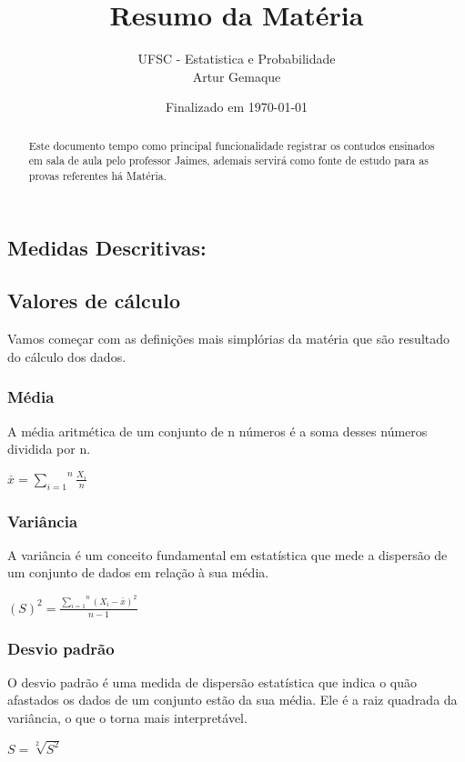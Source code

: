 \documentclass{article}
\title{\textbf{Resumo da Matéria}}
\author{UFSC - Estatistica e Probabilidade \\ Artur Gemaque}
\date{Finalizado em \today}
\begin{document}
\maketitle

\begin{abstract}
Este documento tempo como principal funcionalidade registrar os contudos ensinados em sala de aula pelo professor Jaimes, ademais servirá como fonte de estudo para as provas referentes há Matéria.
\end{abstract}

\begin{multicols}{2} %
\section{ Medidas Descritivas:}

  \subsection{Valores de cálculo}
      Vamos começar com as definições mais simplórias da matéria que são resultado do cálculo dos dados.

      \subsubsection{Média}
      A média aritmética de um conjunto de n números é a soma desses números dividida por n.
        \begin{center}
          $ \overset{\_}{x} =  \overset{n}{\underset{i=1}{\sum}} \frac{X_i}{n}  $
        \end{center}

      \subsubsection{Variância}
      A variância é um conceito fundamental em estatística que mede a dispersão de um conjunto de dados em relação à sua média.
        \begin{center}
          $ (S)^2 =  \frac{\overset{n}{\underset{i=1}{\sum}} (X_i - \overset{\_}{x} )^2 }{n - 1} $
        \end{center}

      \subsubsection{Desvio padrão}
      O desvio padrão é uma medida de dispersão estatística que indica o quão afastados os dados de um conjunto estão da sua média. Ele é a raiz quadrada da variância, o que o torna mais interpretável.
        \begin{center}
          $ S = \sqrt[2]{S^2}$
        \end{center}


\end{multicols}
\end{document}
